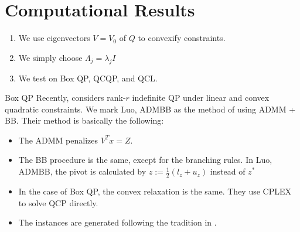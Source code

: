 \documentclass[aspectratio=1610, 9pt]{beamer}
\begin{document}
\section{Computational Results}
\begin{frame}
  \begin{enumerate}
    \item We use eigenvectors \(V = V_0\) of \(Q\) to convexify constraints.
    \item We simply choose \(\Lambda_j = \lambda_j I\)
    \item We test on Box QP, QCQP, and QCL.
  \end{enumerate}
\end{frame}
\setlength\pdfpagewidth{16.00cm}%
\setlength\pdfpageheight{20.00cm}%
\begin{frame}[standout]{Box QP}
  Recently, \cite{luo_new_2019} considers rank-\(r\) indefinite QP under linear and convex quadratic constraints. We mark \textsf{Luo, ADMBB} as the method of using ADMM + BB.  Their method is basically the following:
  \begin{itemize}
    \item The ADMM penalizes \(V^Tx = Z\).
    \item The BB procedure is the same, except for the branching rules. In \textsf{Luo, ADMBB}, the pivot is calculated by \(z := \frac{1}{2}(l_z + u_z)\) instead of \(z^*\)
    \item In the case of Box QP, the convex relaxation is the same. They use CPLEX to solve QCP directly.
    \item The instances are generated following the tradition in \cite{le_an_solving_1997}.
  \end{itemize}



\end{frame}
\end{document}
